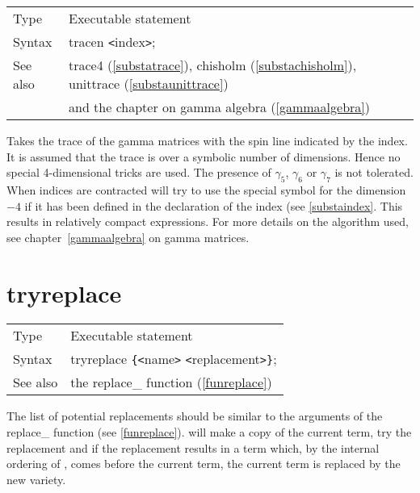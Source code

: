 \noindent \begin{tabular}{ll}
Type & Executable statement\\
Syntax & tracen {\tt<}index{\tt>}; \\
See also & trace4 (\ref{substatrace}), chisholm (\ref{substachisholm}),
    unittrace (\ref{substaunittrace}) \\ &
    and the chapter on gamma algebra (\ref{gammaalgebra})
\end{tabular} \vspace{4mm}

\noindent Takes the trace of the gamma 
matrices with the spin line indicated by the index. It is 
assumed that the trace is over a symbolic number of dimensions. Hence no 
special 4-dimensional tricks are used. The presence of $\gamma_5$, 
$\gamma_6$ or $\gamma_7$ is not tolerated. When indices are contracted 
{\FORM} will try to use the special symbol for the dimension$-4$ if it has 
been defined in the declaration of the index (see \ref{substaindex}. This 
results in relatively compact expressions. For more details on the 
algorithm used, see chapter~\ref{gammaalgebra} on gamma matrices. 
\vspace{10mm}


\section{tryreplace}
\label{substatryreplace}

\noindent \begin{tabular}{ll}
Type & Executable statement\\
Syntax & tryreplace \verb:{:{\tt<}name{\tt>} {\tt<}replacement{\tt>}\verb:}:;
\\ See also & the replace\_ function (\ref{funreplace})
\end{tabular} \vspace{4mm}

\noindent The list of potential replacements should be 
similar to the arguments of the replace\_ 
function (see \ref{funreplace}). {\FORM} will 
make a copy of the current term, try the replacement and if the replacement 
results in a term which, by the internal ordering of {\FORM}, comes before 
the current term, the current term is replaced by the new variety. 
\vspace{10mm}

